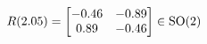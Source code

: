 \documentclass[preview]{standalone}
\begin{document}
\begin{align*}
\special{dvisvgm:raw <g id='unique000'>}R(2.05) = \begin{bmatrix} -0.46 & -0.89 \\ 0.89 & -0.46 \end{bmatrix} \in \text{SO}(2)\special{dvisvgm:raw </g>}
\end{align*}
\end{document}

